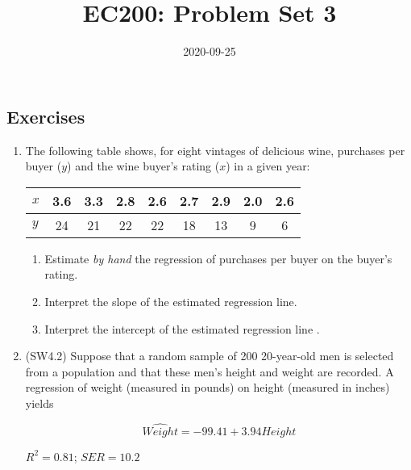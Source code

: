 \documentclass[
]{article}
\title{EC200: Problem Set 3}
\author{}
\date{2020-09-25}
\begin{document}
\maketitle

\hypertarget{exercises}{%
\subsection*{Exercises}\label{exercises}}

\begin{enumerate}
\def\labelenumi{\arabic{enumi}.}
\item
  The following table shows, for eight vintages of delicious wine,
  purchases per buyer (\(y\)) and the wine buyer's rating (\(x\)) in a
  given year:

  \begin{longtable}[]{@{}lcccccccc@{}}
  \toprule
  \(x\) & 3.6 & 3.3 & 2.8 & 2.6 & 2.7 & 2.9 & 2.0 & 2.6\tabularnewline
  \midrule
  \endhead
  \(y\) & 24 & 21 & 22 & 22 & 18 & 13 & 9 & 6\tabularnewline
  \bottomrule
  \end{longtable}

  \begin{enumerate}
  \def\labelenumii{\alph{enumii}.}
  \item
    Estimate \emph{by hand} the regression of purchases per buyer on the
    buyer's rating.\\
  \item
    Interpret the slope of the estimated regression line.\\
  \item
    Interpret the intercept of the estimated regression line .\\
  \end{enumerate}
\item
  (SW4.2) Suppose that a random sample of 200 20-year-old men is
  selected from a population and that these men's height and weight are
  recorded. A regression of weight (measured in pounds) on height
  (measured in inches) yields

  \[\widehat{Weight}=-99.41 + 3.94 Height\]

  \(R^2 = 0.81\); \(SER = 10.2\)


\end{enumerate}
\end{document}
